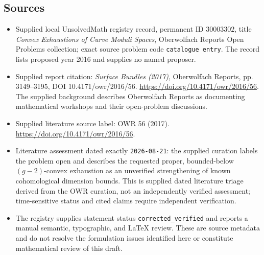 \documentclass[11pt]{article}
\begin{document}
\subsection{Sources}
\begin{itemize}
\item Supplied local UnsolvedMath registry record, permanent ID \(30003302\), title \emph{Convex Exhaustions of Curve Moduli Spaces}, Oberwolfach Reports Open Problems collection; exact source problem code \texttt{catalogue entry}. The record lists proposed year 2016 and supplies no named proposer.
\item Supplied report citation: \emph{Surface Bundles (2017)}, Oberwolfach Reports, pp. 3149--3195, DOI 10.4171/owr/2016/56. \url{https://doi.org/10.4171/owr/2016/56}. The supplied background describes Oberwolfach Reports as documenting mathematical workshops and their open-problem discussions.
\item Supplied literature source label: OWR 56 (2017). \url{https://doi.org/10.4171/owr/2016/56}.
\item Literature assessment dated exactly \texttt{2026-08-21}: the supplied curation labels the problem open and describes the requested proper, bounded-below \((g-2)\)-convex exhaustion as an unverified strengthening of known cohomological dimension bounds. This is supplied dated literature triage derived from the OWR curation, not an independently verified assessment; time-sensitive status and cited claims require independent verification.
\item The registry supplies statement status \texttt{corrected\_verified} and reports a manual semantic, typographic, and LaTeX review. These are source metadata and do not resolve the formulation issues identified here or constitute mathematical review of this draft.
\end{itemize}
\end{document}
